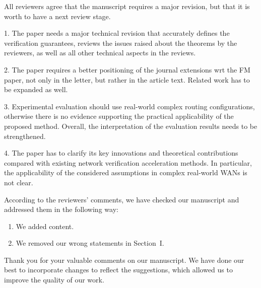 \editor%

\begin{generalcomment}
All reviewers agree that the manuscript requires a major revision, 
but that it is worth to have a next review stage. 

1. The paper needs a major technical revision that accurately defines
the verification guarantees, reviews the issues raised about the
theorems by the reviewers, as well as all other technical aspects in
the reviews.

2. The paper requires a better positioning of the journal extensions
wrt the FM paper, not only in the letter, but rather in the article
text. Related work has to be expanded as well.

3. Experimental evaluation should use real-world complex routing
configurations, otherwise there is no evidence supporting the
practical applicability of the proposed method. Overall, the
interpretation of the evaluation results needs to be strengthened.

4. The paper has to clarify its key innovations and theoretical
contributions compared with existing network verification acceleration
methods. In particular, the applicability of the considered
assumptions in complex real-world WANs is not clear.
\end{generalcomment}

\begin{revresponse}
	According to the reviewers' comments, we have checked our manuscript and addressed them in the following way:
	\begin{enumerate}
		\item We added content.
		\item We removed our wrong statements in Section~I.
	\end{enumerate}
\end{revresponse}
\begin{concludingresponse}
	Thank you for your valuable comments on our manuscript.
	We have done our best to incorporate changes to reflect the suggestions, which allowed us to improve the quality of our work.
\end{concludingresponse}